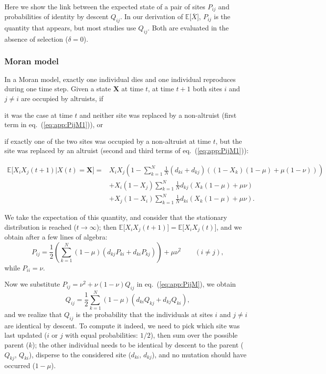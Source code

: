 \documentclass[11pt, letterpaper]{article}
\renewcommand{\eqref}[1]{\textup{{\normalfont eq.~(\ref{#1}}\normalfont)}}
\newcommand{\Esp}[1]{\mathbb{E}\big[ #1\big]}%
\newcommand{\mutbias}{\nu}
\newcommand{\selstr}{\delta}
\begin{document}
Here we show the link between the expected state of a pair of sites $P_{ij}$ and probabilities of identity by descent $Q_{ij}$. In our derivation of $\Esp{\overline{X}}$, $P_{ij}$ is the quantity that appears, but most studies use $Q_{ij}$. Both are evaluated in the absence of selection ($\selstr = 0$). 

\subsubsection{Moran model}
In a Moran model, exactly one individual dies and one individual reproduces during one time step. Given a state $\mathbf{X}$ at time $t$, at time $t+1$ both sites $i$ and $j\neq i$ are occupied by altruists, if \begin{inparaenum}[\it i\rm)]\item it was the case at time $t$ and neither site was replaced by a non-altruist (first term in \eqref{eq:app:PijM1}), or \item if exactly one of the two sites was occupied by a non-altruist at time $t$, but the site was replaced by an altruist (second and third terms of \eqref{eq:app:PijM1}): \end{inparaenum}
%
\begin{align}\label{eq:app:PijM1}
 \Esp{X_iX_j(t+1)|X(t)=\mathbf{X}} = & X_i X_j \left(1 - \sum_{k=1}^N \frac{1}{N} \left( d_{ki} + d_{kj} \right) \left( (1-X_k) (1-\mu) + \mu (1-\mutbias)\right) \right) \nonumber \\
  &+ X_i (1-X_j) \sum_{k=1}^N \frac{1}{N} d_{kj} \left( X_k (1-\mu) + \mu \mutbias \right)  \\
& + X_j (1-X_i) \sum_{k=1}^N \frac{1}{N} d_{ki} \left( X_k (1-\mu) + \mu \mutbias \right). \nonumber
\end{align}

We take the expectation of this quantity, and consider that the stationary distribution is reached ($t\to \infty$); then $\Esp{X_iX_j(t+1)} = \Esp{X_i X_j (t)}$, and we obtain after a few lines of algebra:
%
\begin{equation}\label{eq:app:PijM}
P_{ij} = \frac{1}{2} \left(\sum_{k=1}^N (1-\mu) \left( d_{kj} P_{ki} + d_{ki} P_{kj}\right) \right) + \mu \mutbias^2 \qquad (i\neq j ),
\end{equation} 
while $P_{ii}=\mutbias$. 

Now we substitute $P_{ij} = \mutbias^2 + \mutbias (1-\mutbias) Q_{ij}$ in \eqref{eq:app:PijM}, we obtain
\begin{equation}\label{eq:app:QijM}
Q_{ij} = \frac{1}{2} \sum_{k=1}^N (1-\mu) \left( d_{ki} Q_{kj} + d_{kj} Q_{ki}\right),
\end{equation}
and we realize that $Q_{ij}$ is the probability that the individuals at sites $i$ and $j \neq i$ are identical by descent. To compute it indeed, we need to pick which site was last updated ($i$ or $j$ with equal probabilities: $1/2$), then sum over the possible parent ($k$); the other individual needs to be identical by descent to the parent ($Q_{kj}$, $Q_{ki}$), disperse to the considered site ($d_{ki}$, $d_{kj}$), and no mutation should have occurred ($1-\mu$). 
\end{document}
